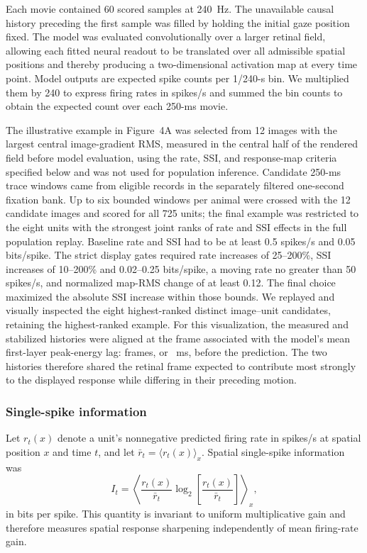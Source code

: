 \documentclass{lite}
\begin{document}
Each movie contained 60 scored samples at 240~Hz. The unavailable causal history preceding the first sample was filled by holding the initial gaze position fixed. The model was evaluated convolutionally over a larger retinal field, allowing each fitted neural readout to be translated over all admissible spatial positions and thereby producing a two-dimensional activation map at every time point. Model outputs are expected spike counts per 1/240-s bin. We multiplied them by 240 to express firing rates in spikes/s and summed the bin counts to obtain the expected count over each 250-ms movie.

The illustrative example in Figure~4A was selected from 12 images with the largest central image-gradient RMS, measured in the central half of the rendered field before model evaluation, using the rate, SSI, and response-map criteria specified below and was not used for population inference. Candidate 250-ms trace windows came from eligible records in the separately filtered one-second fixation bank. Up to six bounded windows per animal were crossed with the 12 candidate images and scored for all 725 units; the final example was restricted to the eight units with the strongest joint ranks of rate and SSI effects in the full population replay. Baseline rate and SSI had to be at least 0.5 spikes/s and 0.05 bits/spike. The strict display gates required rate increases of 25--200\%, SSI increases of 10--200\% and 0.02--0.25 bits/spike, a moving rate no greater than 50 spikes/s, and normalized map-RMS change of at least 0.12. The final choice maximized the absolute SSI increase within those bounds. We replayed and visually inspected the eight highest-ranked distinct image--unit candidates, retaining the highest-ranked example. For this visualization, the measured and stabilized histories were aligned at the frame associated with the model's mean first-layer peak-energy lag: \FigFourExampleLagFrames{} frames, or \FigFourExampleLagMs{}~ms, before the prediction. The two histories therefore shared the retinal frame expected to contribute most strongly to the displayed response while differing in their preceding motion.

\subsubsection{Single-spike information}

Let $r_t(x)$ denote a unit's nonnegative predicted firing rate in spikes/s at spatial position $x$ and time $t$, and let $\bar r_t=\langle r_t(x)\rangle_x$. Spatial single-spike information was
\begin{equation}
I_t =
\left\langle
\frac{r_t(x)}{\bar r_t}
\log_2\!\left[\frac{r_t(x)}{\bar r_t}\right]
\right\rangle_x ,
\end{equation}
in bits per spike. This quantity is invariant to uniform multiplicative gain and therefore measures spatial response sharpening independently of mean firing-rate gain.
\end{document}
